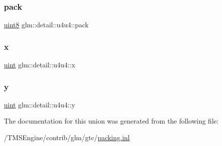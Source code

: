 \subsubsection{\texorpdfstring{pack}{pack}}
{\footnotesize\ttfamily \hyperlink{namespaceglm_1_1detail_aef2588f97d090cc19fbbe0c74fe17c8f}{uint8} glm\+::detail\+::u4u4\+::pack}

\mbox{\label{unionglm_1_1detail_1_1u4u4_a488b94e524db2319dd7801ef632ef7f1}} 
\subsubsection{\texorpdfstring{x}{x}}
{\footnotesize\ttfamily \hyperlink{group__core__precision_ga4fd29415871152bfb5abd588334147c8}{uint} glm\+::detail\+::u4u4\+::x}

\mbox{\label{unionglm_1_1detail_1_1u4u4_a397ae8c3903b0fd4fe9c88617607f7af}} 
\subsubsection{\texorpdfstring{y}{y}}
{\footnotesize\ttfamily \hyperlink{group__core__precision_ga4fd29415871152bfb5abd588334147c8}{uint} glm\+::detail\+::u4u4\+::y}



The documentation for this union was generated from the following file\+:\begin{DoxyCompactItemize}
\item 
/\+T\+M\+S\+Engine/contrib/glm/gtc/\hyperlink{packing_8inl}{packing.\+inl}\end{DoxyCompactItemize}
